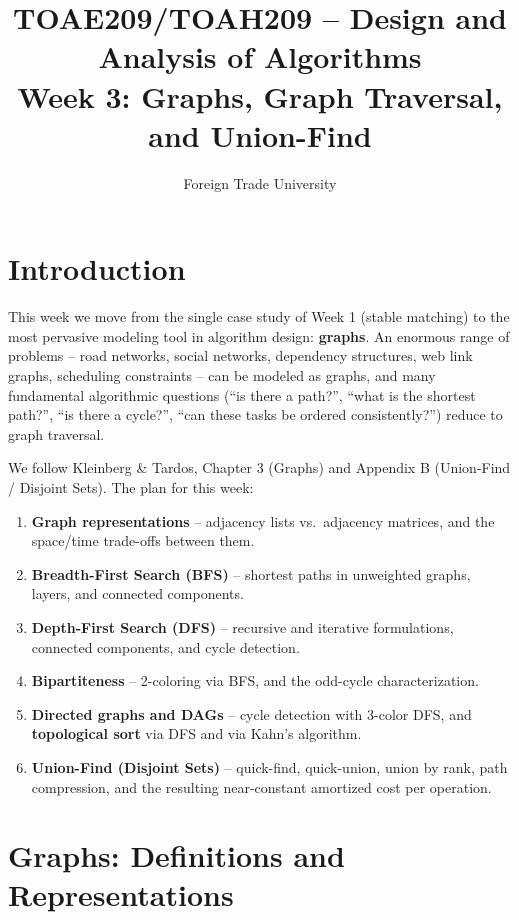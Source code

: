 \documentclass[11pt]{article}
\title{TOAE209/TOAH209 -- Design and Analysis of Algorithms\\[4pt]
\large Week 3: Graphs, Graph Traversal, and Union-Find}
\author{Foreign Trade University}
\date{}
\begin{document}
\maketitle
\tableofcontents

\section{Introduction}

This week we move from the single case study of Week 1 (stable matching) to the most
pervasive modeling tool in algorithm design: \textbf{graphs}. An enormous range of
problems -- road networks, social networks, dependency structures, web link graphs,
scheduling constraints -- can be modeled as graphs, and many fundamental algorithmic
questions (``is there a path?'', ``what is the shortest path?'', ``is there a cycle?'',
``can these tasks be ordered consistently?'') reduce to graph traversal.

We follow Kleinberg \& Tardos, Chapter 3 (Graphs) and Appendix B (Union-Find / Disjoint
Sets). The plan for this week:

\begin{enumerate}
    \item \textbf{Graph representations} -- adjacency lists vs.\ adjacency matrices, and
    the space/time trade-offs between them.
    \item \textbf{Breadth-First Search (BFS)} -- shortest paths in unweighted graphs,
    layers, and connected components.
    \item \textbf{Depth-First Search (DFS)} -- recursive and iterative formulations,
    connected components, and cycle detection.
    \item \textbf{Bipartiteness} -- 2-coloring via BFS, and the odd-cycle characterization.
    \item \textbf{Directed graphs and DAGs} -- cycle detection with 3-color DFS, and
    \textbf{topological sort} via DFS and via Kahn's algorithm.
    \item \textbf{Union-Find (Disjoint Sets)} -- quick-find, quick-union, union by rank,
    path compression, and the resulting near-constant amortized cost per operation.
\end{enumerate}

\section{Graphs: Definitions and Representations}
\end{document}
